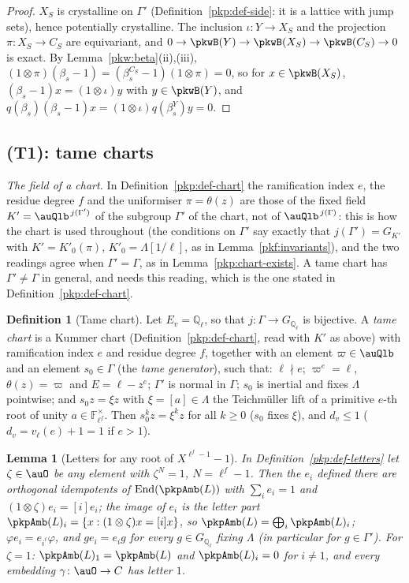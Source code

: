 \documentclass[10pt]{amsart}
\newtheorem{lemma}[theorem]{Lemma}
\theoremstyle{definition}
\newtheorem{definition}[theorem]{Definition}
\theoremstyle{remark}
\newcommand{\Q}{\mathbb Q}
\begin{document}
\begin{proof}
$X_S$ is crystalline on $\Gamma'$ (Definition~\ref{pkp:def-side}: it is a lattice with jump sets),
hence potentially crystalline. The inclusion $\iota\colon Y\to X_S$ and the projection $\pi\colon X_S\to
C_S$ are equivariant, and $0\to\pkwB(Y)\to\pkwB(X_S)\to\pkwB(C_S)\to0$ is exact. By
Lemma~\ref{pkw:beta}(ii),(iii), $(1\otimes\pi)(\beta_s-1)=(\beta^{C_S}_s-1)(1\otimes\pi)=0$, so for
$x\in\pkwB(X_S)$, $(\beta_s-1)x=(1\otimes\iota)y$ with $y\in\pkwB(Y)$, and
$q(\beta_s)(\beta_s-1)x=(1\otimes\iota)q(\beta^Y_s)y=0$.
\end{proof}

\subsection{(T1): tame charts}\label{pkw:ss-T1}

\emph{The field of a chart.} In Definition~\ref{pkp:def-chart} the ramification index $e$, the residue
degree $f$ and the uniformiser $\pi=\theta(z)$ are those of the fixed field
$K'=\auQlb^{\,j(\Gamma')}$ of the subgroup $\Gamma'$ of the chart, not of $\auQlb^{\,j(\Gamma)}$: this is how
the chart is used throughout (the conditions on $\Gamma'$ say exactly that $j(\Gamma')=G_{K'}$ with
$K'=K'_0(\pi)$, $K'_0=\Lambda[1/\ell]$, as in Lemma~\ref{pkf:invariants}), and the two readings agree
when $\Gamma'=\Gamma$, as in Lemma~\ref{pkp:chart-exists}. A tame chart has $\Gamma'\ne\Gamma$ in general,
and needs this reading, which is the one stated in Definition~\ref{pkp:def-chart}.

\begin{definition}[Tame chart]\label{pkw:def-tame}
Let $E_v=\Q_\ell$, so that $j\colon\Gamma\to G_{\Q_\ell}$ is bijective. A \emph{tame chart} is a Kummer chart
(Definition~\ref{pkp:def-chart}, read with $K'$ as above) with ramification index $e$ and residue degree
$f$, together with an element $\varpi\in\auQlb$ and an element $s_0\in\Gamma$ (the \emph{tame generator}),
such that: $\ell\nmid e$; $\varpi^e=\ell$, $\theta(z)=\varpi$ and $E=\ell-z^e$; $\Gamma'$ is normal in $\Gamma$; $s_0$ is
inertial and fixes $\Lambda$ pointwise; and $s_0z=\xi z$ with $\xi=[a]\in\Lambda$ the Teichm\"uller lift of
a primitive $e$-th root of unity $a\in\mathbb F_{\ell^f}^\times$. Then $s_0^kz=\xi^kz$ for all $k\ge0$
($s_0$ fixes $\xi$), and $d_v\le1$ ($d_v=v_\ell(e)+1=1$ if $e>1$).
\end{definition}

\begin{lemma}[Letters for any root of $X^{\ell^f-1}-1$]\label{pkw:letters}
In Definition~\ref{pkp:def-letters} let $\zeta\in\auO$ be any element with $\zeta^{N}=1$, $N=\ell^f-1$.
Then the $e_i$ defined there are orthogonal idempotents of $\operatorname{End}(\pkpAmb(L))$ with
$\sum_ie_i=1$ and $(1\otimes\zeta)e_i=[i]e_i$; the image of $e_i$ is the letter part
$\pkpAmb(L)_i=\{x:(1\otimes\zeta)x=[i]x\}$, so $\pkpAmb(L)=\bigoplus_i\pkpAmb(L)_i$; $\varphi e_i=
e_{i^\ell}\varphi$, and $ge_i=e_ig$ for every $g\in G_{\Q_\ell}$ fixing $\Lambda$ (in particular for
$g\in\Gamma'$). For $\zeta=1$: $\pkpAmb(L)_1=\pkpAmb(L)$ and $\pkpAmb(L)_i=0$ for $i\ne1$, and every
embedding $\gamma\colon\auO\to C$ has letter $1$.
\end{lemma}
\end{document}
